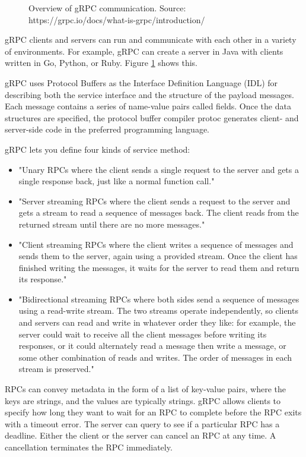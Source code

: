 \begin{figure}[h]
  \centering
  
  \caption{Overview of gRPC communication. Source: https://grpc.io/docs/what-is-grpc/introduction/}
  \label{fig:grpcoverview}
\end{figure}

gRPC clients and servers can run and communicate with each other in a variety of environments. For example, gRPC can create a server in Java with clients written in Go, Python, or Ruby. Figure \ref{fig:grpcoverview} shows this.

gRPC uses Protocol Buffers as the Interface Definition Language (IDL) for describing both the service interface and the structure of the payload messages. Each message contains a series of name-value pairs called fields. Once the data structures are specified, the protocol buffer compiler protoc generates client- and server-side code in the preferred programming language.

gRPC lets you define four kinds of service method:
\begin{itemize}
    \item "Unary RPCs where the client sends a single request to the server and gets a single response back, just like a normal function call." \cite{grpc:concepts}
    \item "Server streaming RPCs where the client sends a request to the server and gets a stream to read a sequence of messages back. The client reads from the returned stream until there are no more messages." \cite{grpc:concepts}
    \item "Client streaming RPCs where the client writes a sequence of messages and sends them to the server, again using a provided stream. Once the client has finished writing the messages, it waits for the server to read them and return its response." \cite{grpc:concepts}
    \item "Bidirectional streaming RPCs where both sides send a sequence of messages using a read-write stream. The two streams operate independently, so clients and servers can read and write in whatever order they like: for example, the server could wait to receive all the client messages before writing its responses, or it could alternately read a message then write a message, or some other combination of reads and writes. The order of messages in each stream is preserved." \cite{grpc:concepts}
\end{itemize}

RPCs can convey metadata in the form of a list of key-value pairs, where the keys are strings, and the values are typically strings. gRPC allows clients to specify how long they want to wait for an RPC to complete before the RPC exits with a timeout error. The server can query to see if a particular RPC has a deadline. Either the client or the server can cancel an RPC at any time. A cancellation terminates the RPC immediately.

